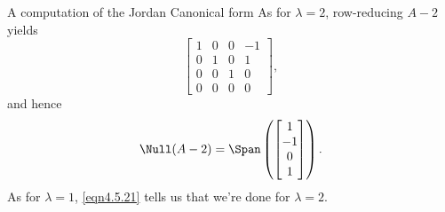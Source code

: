 \begin{exm}{A computation of the Jordan Canonical form}{}
	As for $\lambda =2$, row-reducing $A-2$ yields
	\begin{equation}
		\begin{bmatrix}1 & 0 & 0 & -1 \\ 0 & 1 & 0 & 1 \\ 0 & 0 & 1 & 0 \\ 0 & 0 & 0 & 0\end{bmatrix},
	\end{equation}
	and hence
	\begin{equation}
		\Null (A-2)=\Span \left( \begin{bmatrix}1 \\ -1 \\ 0 \\ 1\end{bmatrix}\right) .
	\end{equation}
	As for $\lambda =1$, \eqref{eqn4.5.21} tells us that we're done for $\lambda =2$.
	

\end{exm}
